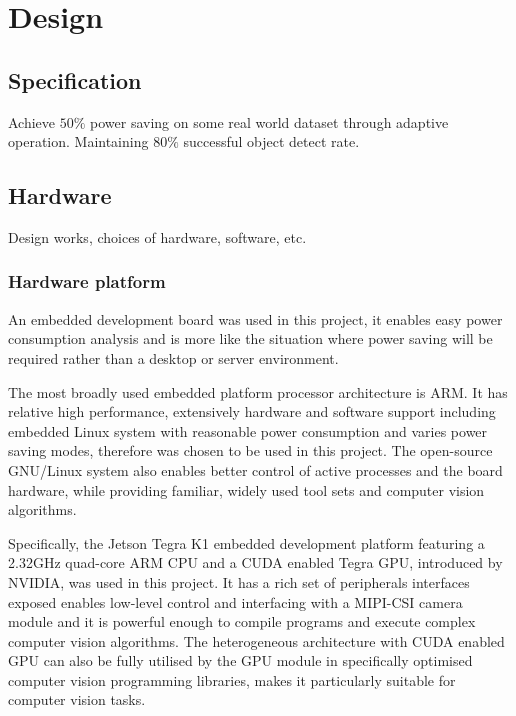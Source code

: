 \chapter{Design} \label{Chapter:Design}

\section{Specification}


Achieve $50\%$ power saving on some real world dataset through adaptive operation.
Maintaining $80\%$ successful object detect rate.

\section{Hardware}

{\color{red}Design works, choices of hardware, software, etc.}

\subsection{Hardware platform}


An embedded development board was used in this project, it enables easy power consumption analysis and is more like the situation where power saving will be required rather than a desktop or server environment.

The most broadly used embedded platform processor architecture is ARM. It has relative high performance, extensively hardware and software support including embedded Linux system with reasonable power consumption and varies power saving modes, therefore was chosen to be used in this project. The open-source GNU/Linux system also enables better control of active processes and the board hardware, while providing familiar, widely used tool sets and computer vision algorithms.

Specifically, the Jetson Tegra K1 embedded development platform \cite{NVIDIA:tk1} featuring a 2.32GHz quad-core ARM CPU and a CUDA enabled Tegra GPU, introduced by NVIDIA, was used in this project. It has a rich set of peripherals interfaces exposed enables low-level control and interfacing with a MIPI-CSI camera module and it is powerful enough to compile programs and execute complex computer vision algorithms. The heterogeneous architecture with CUDA enabled GPU can also be fully utilised by the GPU module in specifically optimised computer vision programming libraries, makes it particularly suitable for computer vision tasks.

